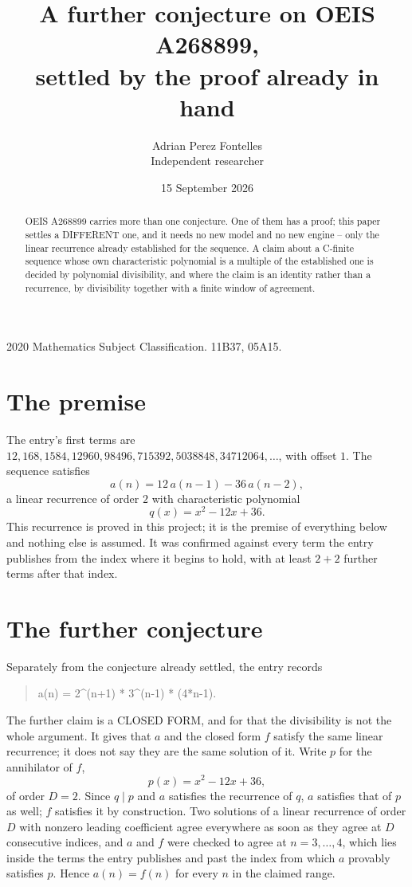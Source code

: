 \documentclass[11pt,a4paper]{article}
\title{A further conjecture on OEIS A268899,\\ \large settled by the proof already in hand}
\author{Adrian Perez Fontelles\\ \small Independent researcher}
\date{15 September 2026}
\theoremstyle{plain}
\theoremstyle{definition}
\begin{document}
\maketitle

\begin{abstract}
OEIS A268899 carries more than one conjecture. One of them has a proof; this paper settles a
DIFFERENT one, and it needs no new model and no new engine -- only the linear recurrence already
established for the sequence. A claim about a C-finite sequence whose own characteristic
polynomial is a multiple of the established one is decided by polynomial divisibility, and where
the claim is an identity rather than a recurrence, by divisibility together with a finite window
of agreement.
\end{abstract}

\noindent\small 2020 Mathematics Subject Classification. 11B37, 05A15.\normalsize

\section{The premise}

The entry's first terms are $12, 168, 1584, 12960, 98496, 715392, 5038848, 34712064,\dots$, with offset $1$. The sequence satisfies
\[
  a(n)=12\,a(n-1) - 36\,a(n-2) ,
\]
a linear recurrence of order $2$ with characteristic polynomial
\[
  q(x)=x^{2} - 12 x + 36 .
\]
This recurrence is proved in this project; it is the premise of everything below and nothing else is assumed.
It was confirmed against every term the entry publishes from the index where it begins to hold,
with at least $2+2$ further terms after that index.

\section{The further conjecture}

Separately from the conjecture already settled, the entry records

\begin{quote}\raggedright a(n) = 2\^{}(n+1) * 3\^{}(n-1) * (4*n-1).\end{quote}

The further claim is a CLOSED FORM, and for that the divisibility is not the whole argument. It
gives that $a$ and the closed form $f$ satisfy the same linear recurrence; it does not say they
are the same solution of it. Write $p$ for the annihilator of $f$,
\[
  p(x)=x^{2} - 12 x + 36 ,
\]
of order $D=2$. Since $q\mid p$ and $a$ satisfies the recurrence of $q$, $a$ satisfies that of
$p$ as well; $f$ satisfies it by construction. Two solutions of a linear recurrence of order $D$
with nonzero leading coefficient agree everywhere as soon as they agree at $D$ consecutive
indices, and $a$ and $f$ were checked to agree at $n=3,\dots,4$,
which lies inside the terms the entry publishes and past the index from which $a$ provably
satisfies $p$. Hence $a(n)=f(n)$ for every $n$ in the claimed range.
\end{document}
